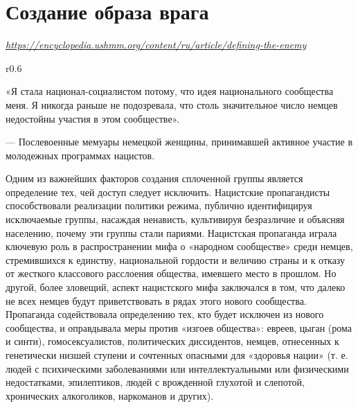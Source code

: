 \newpage
\section{Создание образа врага}

\textit{\url{https://encyclopedia.ushmm.org/content/ru/article/defining-the-enemy}}

\begin{wrapfigure}{r}{0.6\textwidth}
    \begin{fancyquotes}
        «Я стала национал-социалистом потому, что идея национального сообщества  меня. Я никогда раньше не подозревала, что столь значительное число немцев недостойны участия в этом сообществе».\\[1em]

        \begin{flushright}
            --- Послевоенные мемуары немецкой женщины, принимавшей активное участие в молодежных программах нацистов.
        \end{flushright}
    \end{fancyquotes}
\end{wrapfigure}
Одним из важнейших факторов создания сплоченной группы является определение тех, чей доступ следует исключить. Нацистские пропагандисты способствовали реализации политики режима, публично идентифицируя исключаемые группы, насаждая ненависть, культивируя безразличие и объясняя населению, почему эти группы стали париями. Нацистская пропаганда играла ключевую роль в распространении мифа о «народном сообществе» среди немцев, стремившихся к единству, национальной гордости и величию страны и к отказу от жесткого классового расслоения общества, имевшего место в прошлом. Но другой, более зловещий, аспект нацистского мифа заключался в том, что далеко не всех немцев будут приветствовать в рядах этого нового сообщества. Пропаганда содействовала определению тех, кто будет исключен из нового сообщества, и оправдывала меры против «изгоев общества»: евреев, цыган (рома и синти), гомосексуалистов, политических диссидентов, немцев, отнесенных к генетически низшей ступени и сочтенных опасными для «здоровья нации» (т. е. людей с психическими заболеваниями или интеллектуальными или физическими недостатками, эпилептиков, людей с врожденной глухотой и слепотой, хронических алкоголиков, наркоманов и других).

